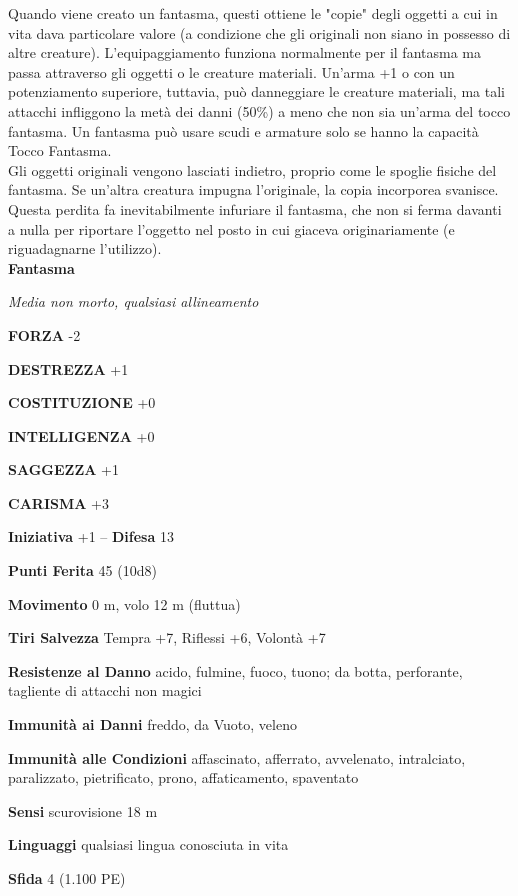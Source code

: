 \begin{multicols}{2}
Quando viene creato un fantasma, questi ottiene le "copie" degli oggetti a cui in vita dava particolare valore (a condizione che gli originali non siano in possesso di altre creature). L'equipaggiamento funziona normalmente per il fantasma ma passa attraverso gli oggetti o le creature materiali. Un'arma +1 o con un potenziamento superiore, tuttavia, può danneggiare le creature materiali, ma tali attacchi infliggono la metà dei danni (50\%) a meno che non sia un'arma del tocco fantasma. Un fantasma può usare scudi e armature solo se hanno la capacità Tocco Fantasma.\\

Gli oggetti originali vengono lasciati indietro, proprio come le spoglie fisiche del fantasma. Se un'altra creatura impugna l'originale, la copia incorporea svanisce. Questa perdita fa inevitabilmente infuriare il fantasma, che non si ferma davanti a nulla per riportare l'oggetto nel posto in cui giaceva originariamente (e riguadagnarne l'utilizzo).\\

\medskip{}\textbf{Fantasma}

\emph{Media non morto, qualsiasi allineamento}

\textbf{FORZA} -2

\textbf{DESTREZZA} +1

\textbf{COSTITUZIONE} +0

\textbf{INTELLIGENZA} +0

\textbf{SAGGEZZA} +1

\textbf{CARISMA} +3

\textbf{Iniziativa} +1 -- \textbf{Difesa} 13

\textbf{Punti Ferita} 45 (10d8)

\textbf{Movimento} 0 m, volo 12 m (fluttua)

\textbf{Tiri Salvezza} Tempra +7, Riflessi +6, Volontà +7

\textbf{Resistenze al Danno} acido, fulmine, fuoco, tuono; da botta, perforante, tagliente di attacchi non magici

\textbf{Immunità ai Danni} freddo, da Vuoto, veleno

\textbf{Immunità alle Condizioni} affascinato, afferrato, avvelenato, intralciato, paralizzato, pietrificato, prono, affaticamento, spaventato

\textbf{Sensi} scurovisione 18 m

\textbf{Linguaggi} qualsiasi lingua conosciuta in vita

\textbf{Sfida} 4 (1.100 PE)


\end{multicols}
